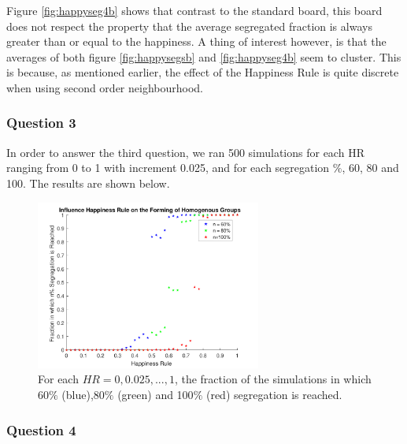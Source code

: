 Figure \ref{fig:happyseg4b} shows that contrast to the standard board, this board does not respect the property that the average segregated fraction is always greater than or equal to the happiness. 
A thing of interest however, is that the averages of both figure \ref{fig:happysegsb} and \ref{fig:happyseg4b} seem to cluster. 
This is because, as mentioned earlier, the effect of the Happiness Rule is quite discrete when using second order neighbourhood.

\subsubsection{Question 3}
In order to answer the third question, we ran 500 simulations for each HR ranging from 0 to 1 with increment 0.025, and for each segregation $\%$, 60, 80 and 100. 
The results are shown below.
\begin{figure}[H]
    \centering
    \includegraphics[width=280px]{happy_segr_60_80_100.pdf}
    \caption{For each $HR = 0,0.025,...,1$, the fraction of the simulations in which 60$\%$ (blue),80$\%$ (green) and 100$\%$ (red) segregation is reached.}
    \label{fig:happyseg4c}
\end{figure}

\subsubsection{Question 4}

